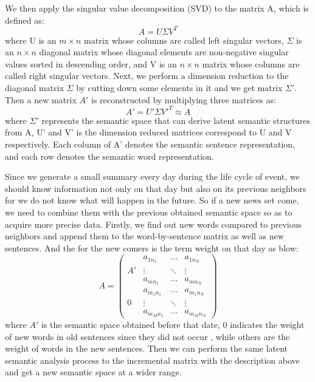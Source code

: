 \documentclass[runningheads,a4paper]{llncs}
\begin{document}
We then apply the singular value decomposition (SVD) to the matrix A, which is defined as:
\begin{equation}
A = U \Sigma V^T
\end{equation}
where U is an $m×n$ matrix whose columns are called left singular vectors, $\Sigma$ is an $n×n$ diagonal matrix whose diagonal elements are non-negative singular values sorted in descending order, and V is an $n×n$ matrix whose columns are called right singular vectors.
Next, we perform a dimension reduction to the diagonal matrix $\Sigma$ by cutting down some elements in it and we get matrix $\Sigma '$. Then a new matrix $A'$ is reconstructed by multiplying three matrices as:
\begin{equation}
A' = U' \Sigma V'^T \approx A
\end{equation}
 where $\Sigma'$ represents the semantic space that can derive latent semantic structures from A, U' and V' is the dimension reduced matrices correspond to U and V respectively. Each column of A' denotes the semantic sentence representation, and each row denotes the semantic word representation.

Since we generate a small summary every day during the life cycle of event, we should know information not only on that day but also on its previous neighbors for we do not know what will happen in the future. So if a new news set come, we need to combine them with the previous obtained semantic space so as to acquire more precise data. Firstly, we find out new words compared to previous neighbors and append them to the word-by-sentence matrix as well as new sentences. And the   for the new comers is the term weight on that day as blow: 
\begin{displaymath}
A =  \left( \begin{array}{cccc}
				&	a_{1n_1}	 &	 \ldots 	& a_{1n_N} 	\\
A'				& 	\vdots 	&	\ddots 	& \vdots 		\\
				& 	a_{mn_1} & 	\ldots 	& a_{mn_N}	\\

				& a_{m_1n_1} & 	\ldots 	& a_{m_1n_N} \\
0				& 	\vdots 	& 	\ddots 	& \vdots 		\\
				& a_{m_Mn_1} &   \ldots 	&a_{m_Mn_N}
\end{array}\right)
\end{displaymath}
where $A'$ is the semantic space obtained before that date, $0$ indicates the weight of new words in old sentences since they did not occur , while others are the weight of words in the new sentences.  
Then we can perform the same latent semantic analysis process to the incremental matrix with the description above and get a new semantic space at a wider range.
\end{document}
